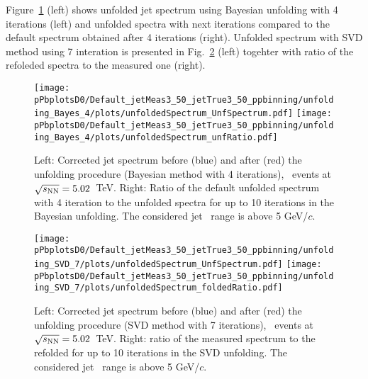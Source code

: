 
Figure~\ref{fig:UnfSpec_pPb_Dzero_reg4} (left) shows unfolded jet \pt spectrum using Bayesian unfolding with 4 iterations (left) and unfolded spectra with next iterations compared to the default spectrum obtained after 4 iterations (right).
Unfolded spectrum with SVD method using 7 interation is presented in Fig.~\ref{fig:UnfSpec_pPb_Dzero_SVD} (left) togehter with ratio of the refoleded spectra to the measured one (right).

\begin{figure}[bth]
\centering
\texttt{[image: pPbplotsD0/Default\_jetMeas3\_50\_jetTrue3\_50\_ppbinning/unfolding\_Bayes\_4/plots/unfoldedSpectrum\_UnfSpectrum.pdf]}
\texttt{[image: pPbplotsD0/Default\_jetMeas3\_50\_jetTrue3\_50\_ppbinning/unfolding\_Bayes\_4/plots/unfoldedSpectrum\_unfRatio.pdf]}
\caption{Left: Corrected jet \pt spectrum before (blue) and after (red) the unfolding procedure (Bayesian method with 4 iterations), \pPb\ events at $\sqrt{s_{\rm NN}}=5.02$~TeV. Right: Ratio of the default unfolded spectrum with 4 iteration to the unfolded spectra for up to 10 iterations in the Bayesian unfolding. The considered jet \pt\ range is above 5 GeV/$c$.}
\label{fig:UnfSpec_pPb_Dzero_reg4}
\end{figure}

\begin{figure}[bth]
\centering
\texttt{[image: pPbplotsD0/Default\_jetMeas3\_50\_jetTrue3\_50\_ppbinning/unfolding\_SVD\_7/plots/unfoldedSpectrum\_UnfSpectrum.pdf]}
\texttt{[image: pPbplotsD0/Default\_jetMeas3\_50\_jetTrue3\_50\_ppbinning/unfolding\_SVD\_7/plots/unfoldedSpectrum\_foldedRatio.pdf]}
\caption{Left: Corrected jet \pt spectrum before (blue) and after (red) the unfolding procedure (SVD method with 7 iterations), \pPb\ events at $\sqrt{s_{\rm NN}}=5.02$~TeV. Right: ratio of the measured spectrum to the refolded for up to 10 iterations in the SVD unfolding. The considered jet \pt\ range is above 5 GeV/$c$.}
\label{fig:UnfSpec_pPb_Dzero_SVD}
\end{figure}


